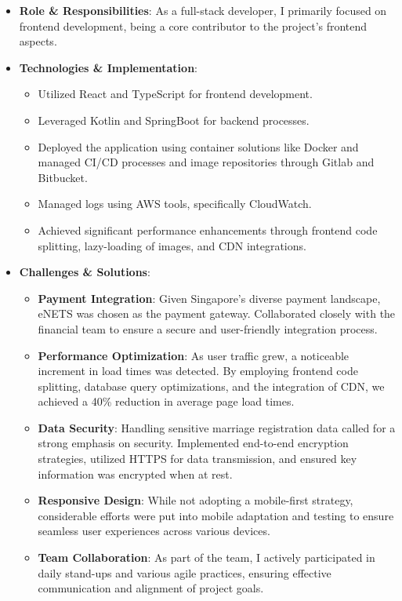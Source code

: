 \documentclass{resume}
\begin{document}
  \begin{itemize}
    \item \textbf{Role \& Responsibilities}: As a full-stack developer, I primarily focused on frontend development, being a core contributor to the project's frontend aspects.
    \item \textbf{Technologies \& Implementation}:
      \begin{itemize}
        \item Utilized React and TypeScript for frontend development.
        \item Leveraged Kotlin and SpringBoot for backend processes.
        \item Deployed the application using container solutions like Docker and managed CI/CD processes and image repositories through Gitlab and Bitbucket.
        \item Managed logs using AWS tools, specifically CloudWatch.
        \item Achieved significant performance enhancements through frontend code splitting, lazy-loading of images, and CDN integrations.
      \end{itemize}
    \item \textbf{Challenges \& Solutions}:
      \begin{itemize}
        \item \textbf{Payment Integration}: Given Singapore's diverse payment landscape, eNETS was chosen as the payment gateway. Collaborated closely with the financial team to ensure a secure and user-friendly integration process.
        \item \textbf{Performance Optimization}: As user traffic grew, a noticeable increment in load times was detected. By employing frontend code splitting, database query optimizations, and the integration of CDN, we achieved a 40\% reduction in average page load times.
        \item \textbf{Data Security}: Handling sensitive marriage registration data called for a strong emphasis on security. Implemented end-to-end encryption strategies, utilized HTTPS for data transmission, and ensured key information was encrypted when at rest.
        \item \textbf{Responsive Design}: While not adopting a mobile-first strategy, considerable efforts were put into mobile adaptation and testing to ensure seamless user experiences across various devices.
        \item \textbf{Team Collaboration}: As part of the team, I actively participated in daily stand-ups and various agile practices, ensuring effective communication and alignment of project goals.
      \end{itemize}
  \end{itemize}
  
\end{document}
